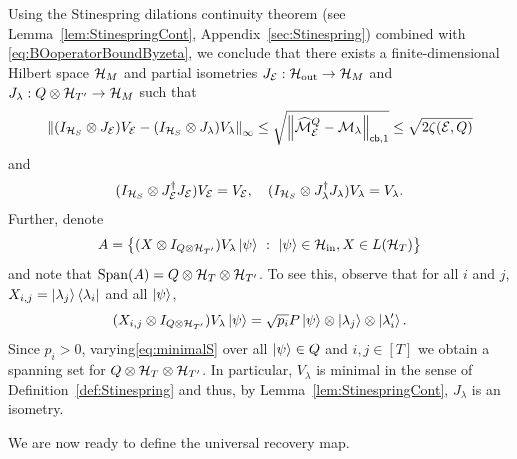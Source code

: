 \documentclass[10pt]{article}
\DeclareMathOperator{\Span}{Span}
\newcommand{\SIN}{\mathrm{in}}
\newcommand{\SOUT}{\mathrm{out}}
\newcommand{\ppp}[1]{\left\{#1\right\}}
\newcommand{\norm}[1]{\left\|#1\right\|}
\newcommand{\s}[1]{\mathsf{#1}}
\begin{document}
Using the Stinespring dilations continuity theorem (see Lemma~\ref{lem:StinespringCont}, Appendix~\ref{sec:Stinespring}) combined with \eqref{eq:BOoperatorBoundByzeta}, we conclude that there exists a finite-dimensional Hilbert space ${\cal H}_M$ and partial isometries $J_{\calE}:\calH_{\SOUT}\to \calH_M$ and $J_{\lambda}:Q\otimes {\cal H}_{T'}\to {\cal H}_M$ such that 
 \begin{equation}
     \norm{(I_{\calH_S}\otimes J_{\calE})V_{\calE}-(I_{\calH_S}\otimes J_{\lambda}){V}_{\lambda}}_\infty\leq \sqrt{\norm{\widehat{\calM}^Q_{\calE}  -\calM_{\lambda} }_{\s{cb}, 1}}\leq \sqrt{2\zeta(\calE,Q)}
     \label{eq:ContinuityCPfirst}
 \end{equation}
and 
 \begin{align}
      (I_{{\cal H}_{S}}\otimes J_{{\cal E}}^\dag J_{{\cal E}})V_{{\cal E}}=V_{{\cal E}}, \quad (I_{{\cal H}_{S}}\otimes J_{\lambda}^\dag J_{\lambda})V_{\lambda}=V_{\lambda}.\label{eq:commute}
 \end{align}
 Further, denote 
 \[
 A=\ppp{(X\otimes I_{Q\otimes \calH_{T'}})V_{\lambda} \ket{\psi} ~:~ \ket{\psi}\in \calH_{\SIN}, X\in L(\calH_T)}
 \] 
 and note that $\Span(A)=Q\otimes \calH_T\otimes \calH_{T'}$. To see this, observe that for all $i$ and $j$, 
 $X_{i,j}=\ket{\lambda_j}\bra{\lambda_i}$ and all $\ket{\psi}$,
 \begin{equation}
     (X_{i,j}\otimes I_{Q\otimes {\cal H}_{T'}})V_{\lambda} \ket{\psi}= \sqrt{p_i}P\ket{\psi}\otimes \ket{\lambda_j}\otimes \ket{\lambda_i'}.\label{eq:minimalS}
 \end{equation}
 Since $p_i>0$, varying\eqref{eq:minimalS} over all $\ket{\psi}\in Q$ and $i,j\in [T]$ we obtain a spanning set for $Q\otimes {\cal H}_{T}\otimes {\cal H}_{T'}$. In particular, $V_{\lambda}$ is minimal in the sense of Definition~\ref{def:Stinespring} and thus, by Lemma~\ref{lem:StinespringCont}, $J_{\lambda}$ is an isometry. 
 
 We are now ready to define the universal recovery map. \vspace{0.2cm}
\end{document}
